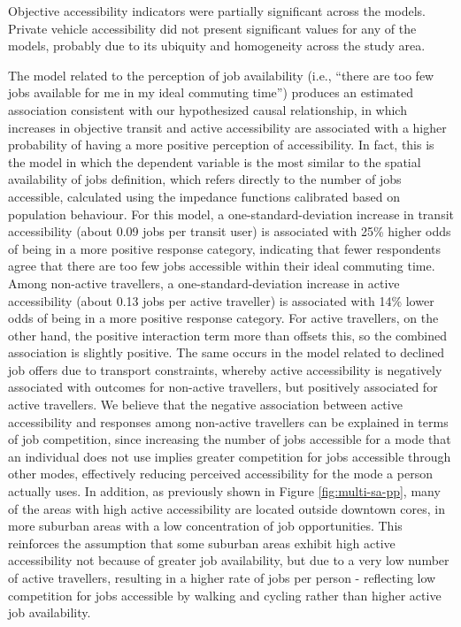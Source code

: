 \documentclass[preprint, 3p,
authoryear]{elsarticle} %
\begin{document}
Objective accessibility indicators were partially significant across the
models. Private vehicle accessibility did not present significant values
for any of the models, probably due to its ubiquity and homogeneity
across the study area.

The model related to the perception of job availability (i.e., ``there
are too few jobs available for me in my ideal commuting time'') produces
an estimated association consistent with our hypothesized causal
relationship, in which increases in objective transit and active
accessibility are associated with a higher probability of having a more
positive perception of accessibility. In fact, this is the model in
which the dependent variable is the most similar to the spatial
availability of jobs definition, which refers directly to the number of
jobs accessible, calculated using the impedance functions calibrated
based on population behaviour. For this model, a one-standard-deviation
increase in transit accessibility (about 0.09 jobs per transit user) is
associated with 25\% higher odds of being in a more positive response
category, indicating that fewer respondents agree that there are too few
jobs accessible within their ideal commuting time. Among non-active
travellers, a one-standard-deviation increase in active accessibility
(about 0.13 jobs per active traveller) is associated with 14\% lower
odds of being in a more positive response category. For active
travellers, on the other hand, the positive interaction term more than
offsets this, so the combined association is slightly positive. The same
occurs in the model related to declined job offers due to transport
constraints, whereby active accessibility is negatively associated with
outcomes for non-active travellers, but positively associated for active
travellers. We believe that the negative association between active
accessibility and responses among non-active travellers can be explained
in terms of job competition, since increasing the number of jobs
accessible for a mode that an individual does not use implies greater
competition for jobs accessible through other modes, effectively
reducing perceived accessibility for the mode a person actually uses. In
addition, as previously shown in Figure \ref{fig:multi-sa-pp}, many of
the areas with high active accessibility are located outside downtown
cores, in more suburban areas with a low concentration of job
opportunities. This reinforces the assumption that some suburban areas
exhibit high active accessibility not because of greater job
availability, but due to a very low number of active travellers,
resulting in a higher rate of jobs per person - reflecting low
competition for jobs accessible by walking and cycling rather than
higher active job availability.
\end{document}
